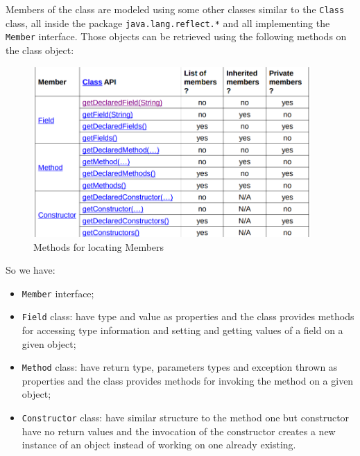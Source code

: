 Members of the class are modeled using some other classes similar to the \verb|Class| class, all inside the package \verb|java.lang.reflect.*| and all implementing the \verb|Member| interface.
Those objects can be retrieved using the following methods on the class object:
\begin{figure}[H]
    \centering
    \includegraphics[width=400px]{images/4_Reflection/members_API.png}
    \caption{Methods for locating Members}
\end{figure}

So we have:
\begin{itemize}
    \item \verb|Member| interface;

    \item \verb|Field| class: have type and value as properties and the class provides methods for accessing type information and setting and getting values of a field on a given object;
    
    \item \verb|Method| class: have return type, parameters types and exception thrown as properties and the class provides methods for invoking the method on a given object;
    
    \item \verb|Constructor| class: have similar structure to the method one but constructor have no return values and the invocation of the constructor creates a new instance of an object instead of working on one already existing.
\end{itemize}

